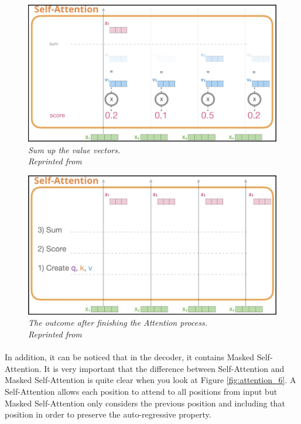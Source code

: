 \begin{figure}[H]
  \centering
  \caption[Sum up the value vectors.]{\emph{Sum up the value vectors. \\
  Reprinted from \citeauthor{alammar_2018} \citeyear{alammar_2018}}}\label{fig:attention_4}
  \includegraphics[scale = 0.3]{figures/attention_4.jpg}  
\end{figure}
\begin{figure}[H]
  \centering
  \caption[The outcome after finishing the Attention process.]{\emph{The outcome after finishing the Attention process. \\Reprinted from \citeauthor{alammar_2018} \citeyear{alammar_2018}}}\label{fig:attention_5}
  \includegraphics[scale = 0.3]{figures/attention_5.jpg}  
\end{figure}

\paragraph{}
In addition, it can be noticed that in the decoder, it contains Masked Self-Attention. It is very important that the difference between Self-Attention and Masked Self-Attention is quite clear when you look at Figure \ref{fig:attention_6}. A Self-Attention allows each position to attend to all positions from input but Masked Self-Attention only considers the previous position and including that position in order to preserve the auto-regressive property.

